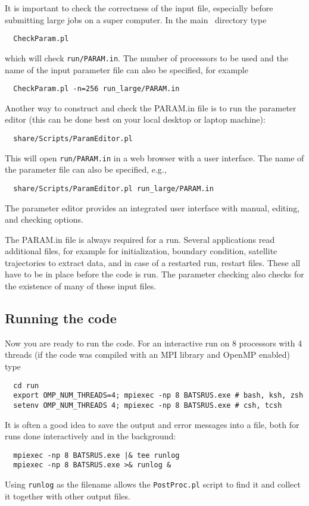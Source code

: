 It is important to check the correctness of the input file, especially before submitting
large jobs on a super computer. In the main \BATSRUS\ directory type
\begin{verbatim}
  CheckParam.pl
\end{verbatim}
which will check {\tt run/PARAM.in}. The number of processors to be used and
the name of the input parameter file can also be specified, for example
\begin{verbatim}
  CheckParam.pl -n=256 run_large/PARAM.in
\end{verbatim}

Another way to construct and check the PARAM.in file is to run the parameter editor
(this can be done best on your local desktop or laptop machine):
\begin{verbatim}
  share/Scripts/ParamEditor.pl
\end{verbatim}
This will open {\tt run/PARAM.in} in a web browser with a user interface.
The name of the parameter file can also be specified, e.g., 
\begin{verbatim}
  share/Scripts/ParamEditor.pl run_large/PARAM.in
\end{verbatim}
The parameter editor provides an integrated user interface with manual, 
editing, and checking options.

The PARAM.in file is always required for a run. Several applications read additional files,
for example for initialization, boundary condition, satellite trajectories to extract data, 
and in case of a restarted run, restart files. These all have to be in place before
the code is run. The parameter checking also checks for the existence of many of these
input files.

\subsection{Running the code}

Now you are ready to run the code. For an interactive run 
on 8 processors with 4 threads (if the code was compiled with an MPI
library and OpenMP enabled) type
\begin{verbatim}
  cd run
  export OMP_NUM_THREADS=4; mpiexec -np 8 BATSRUS.exe # bash, ksh, zsh
  setenv OMP_NUM_THREADS 4; mpiexec -np 8 BATSRUS.exe # csh, tcsh
\end{verbatim}
It is often a good idea to save the output and error messages into a file,
both for runs done interactively and in the background:
\begin{verbatim}
  mpiexec -np 8 BATSRUS.exe |& tee runlog
  mpiexec -np 8 BATSRUS.exe >& runlog &
\end{verbatim}
Using {\tt runlog} as the filename allows the {\tt PostProc.pl} script
to find it and collect it together with other output files.

